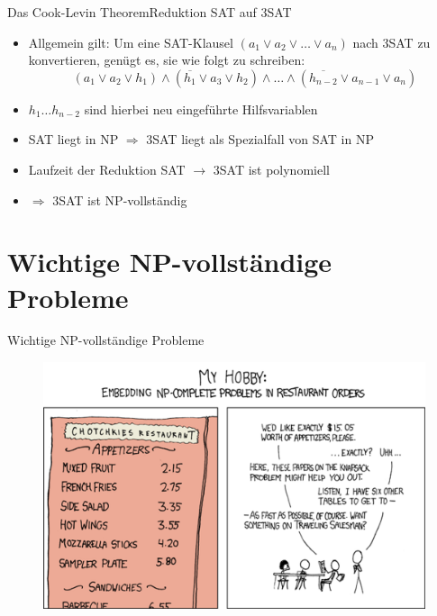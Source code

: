 \documentclass[ignorenonframetext,]{beamer}
\begin{document}
\begin{frame}{Das Cook-Levin Theorem}{Reduktion SAT auf 3SAT}

\begin{itemize}
\itemsep1pt\parskip0pt
\item
  Allgemein gilt: Um eine SAT-Klausel
  $(a_1 \vee a_2 \vee \dots \vee a_n)$ nach 3SAT zu konvertieren, genügt
  es, sie wie folgt zu schreiben:
  \[ (a_1 \vee a_2 \vee h_1) \wedge (\overline{h_1} \vee a_3 \vee h_2) \wedge \dots \wedge (\overline{h_{n-2}} \vee a_{n-1} \vee a_n) \]
\item
  $h_1 \dots h_{n-2}$ sind hierbei neu eingeführte Hilfsvariablen
\item
  SAT liegt in NP $\Rightarrow$ 3SAT liegt als Spezialfall von SAT in NP
\item
  Laufzeit der Reduktion SAT $\rightarrow$ 3SAT ist polynomiell 
\item
  $\Rightarrow$ 3SAT ist NP-vollständig
\end{itemize}

\end{frame}

\section[Probleme]{Wichtige NP-vollständige Probleme}

\begin{frame}{Wichtige NP-vollständige Probleme}

\begin{figure}[htbp]
\centering
\includegraphics{img/xkcd_np_complete_big.png}
\end{figure}

\end{frame}
\end{document}
